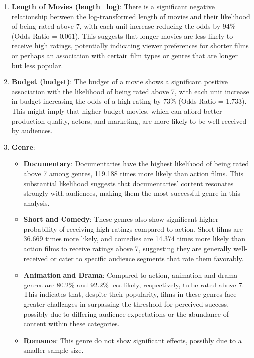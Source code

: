 \documentclass[
  11pt,
]{article}
\providecommand{\tightlist}{%
  \setlength{\itemsep}{0pt}\setlength{\parskip}{0pt}}\usepackage{longtable,booktabs,array}
\begin{document}
\begin{enumerate}
\def\labelenumi{\arabic{enumi}.}
\item
  \textbf{Length of Movies (length\_log)}: There is a significant
  negative relationship between the log-transformed length of movies and
  their likelihood of being rated above 7, with each unit increase
  reducing the odds by 94\% (Odds Ratio = 0.061). This suggests that
  longer movies are less likely to receive high ratings, potentially
  indicating viewer preferences for shorter films or perhaps an
  association with certain film types or genres that are longer but less
  popular.
\item
  \textbf{Budget (budget)}: The budget of a movie shows a significant
  positive association with the likelihood of being rated above 7, with
  each unit increase in budget increasing the odds of a high rating by
  73\% (Odds Ratio = 1.733). This might imply that higher-budget movies,
  which can afford better production quality, actors, and marketing, are
  more likely to be well-received by audiences.
\item
  \textbf{Genre}:

  \begin{itemize}
  \tightlist
  \item
    \textbf{Documentary}: Documentaries have the highest likelihood of
    being rated above 7 among genres, 119.188 times more likely than
    action films. This substantial likelihood suggests that
    documentaries' content resonates strongly with audiences, making
    them the most successful genre in this analysis.
  \item
    \textbf{Short and Comedy}: These genres also show significant higher
    probability of receiving high ratings compared to action. Short
    films are 36.669 times more likely, and comedies are 14.374 times
    more likely than action films to receive ratings above 7, suggesting
    they are generally well-received or cater to specific audience
    segments that rate them favorably.
  \item
    \textbf{Animation and Drama}: Compared to action, animation and
    drama genres are 80.2\% and 92.2\% less likely, respectively, to be
    rated above 7. This indicates that, despite their popularity, films
    in these genres face greater challenges in surpassing the threshold
    for perceived success, possibly due to differing audience
    expectations or the abundance of content within these categories.
  \item
    \textbf{Romance}: This genre do not show significant effects,
    possibly due to a smaller sample size.
  \end{itemize}
\end{enumerate}
\end{document}
